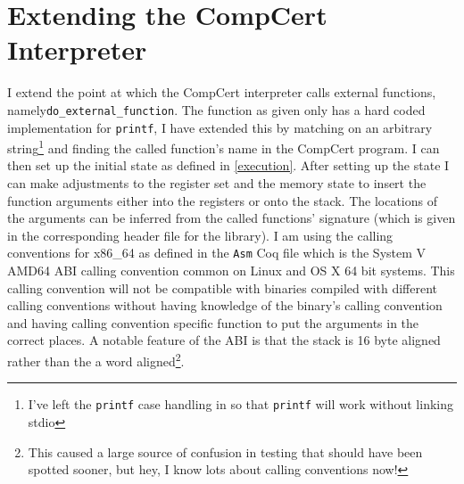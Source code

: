 \section{Extending the CompCert Interpreter}\label{extending}
I extend the point at which the CompCert interpreter calls external functions, namely\newline \lstinline{do_external_function}. The function as given only has a hard coded implementation for \texttt{printf}, I have extended this by matching on an arbitrary string\footnote{I've left the \texttt{printf} case handling in so that \texttt{printf} will work without linking stdio} and finding the called function's name in the CompCert program. I can then set up the initial state as defined in \ref{execution}. After setting up the state I can make adjustments to the register set and the memory state to insert the function arguments either into the registers or onto the stack. The locations of the arguments can be inferred from the called functions' signature (which is given in the corresponding header file for the library). I am using the calling conventions for x86\_64 as defined in the \texttt{Asm} Coq file which is the System V AMD64 ABI calling convention common on Linux and OS X 64 bit systems. This calling convention will not be compatible with binaries compiled with different calling conventions without having knowledge of the binary's calling convention and having calling convention specific function to put the arguments in the correct places. A notable feature of the ABI is that the stack is 16 byte aligned rather than the a word aligned\footnote{This caused a large source of confusion in testing that should have been spotted sooner, but hey, I know lots about calling conventions now!}.

